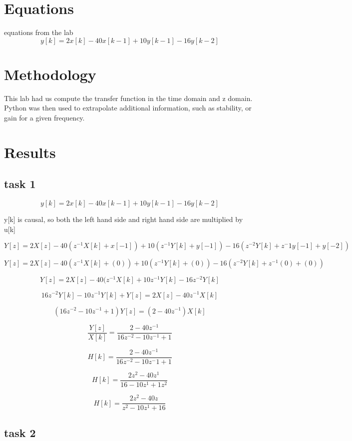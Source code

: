 \documentclass[12pt,a4paper]{article}
\begin{document}
\section{Equations}\label{sec:lit-rev}


equations from the lab
\[y[k] = 2 x[k] - 40 x[k-1] + 10 y[k-1] - 16 y[k-2]\]


\section{Methodology}\label{sec:meth}
This lab had us compute the transfer function in the time domain and z domain. Python was then used to extrapolate additional information, such as stability, or gain for a given frequency.

\section{Results}\label{sec:res}
\subsection*{task 1}
\[y[k] = 2 x[k] - 40 x[k-1] + 10 y[k-1] - 16 y[k-2]\]

y[k] is causal, so both the left hand side and right hand side are multiplied by u[k]

\[Y[z] = 2 X[z] - 40 (z^{-1} X[k] + x[-1]) + 10 (z^{-1} Y[k] + y[-1])-16 (z^{-2} Y[k] + z^-1 y[-1]+ y[-2])\]

\[Y[z] = 2 X[z] - 40 (z^{-1} X[k] + (0)) + 10 (z^{-1} Y[k] + (0)) - 16 (z^{-2} Y[k] + z^{-1} (0) + (0))\]

\[Y[z] = 2 X[z] - 40(z^{-1} X[k] + 10 z^{-1} Y[k] - 16 z^{-2} Y[k]\]

\[16 z^{-2} Y[k] - 10 z^{-1} Y[k] + Y[z] = 2 X[z] - 40 z^{-1} X[k]\]

\[(16 z^{-2} - 10 z^{-1} + 1) Y[z] = (2 - 40 z^{-1}) X[k]\]

\[\frac{Y[z]}{X[k]} = \frac{2 - 40 z^{-1}}{16 z^{-2} - 10 z^{-1} + 1}\]

\[H[k] = \frac {2 - 40 z^{-1}}{16 z^{-2} - 10 z^-{1} + 1}\]

\[H[k] = \frac{2 z^2 - 40 z^1}{16 - 10 z^1 + 1z^2}\]

\[H[k] = \frac{2 z^2 - 40 z}{z^2-10 z^1+16}\]


\subsection*{task 2}
\end{document}

